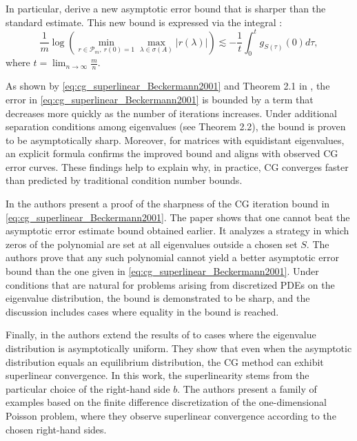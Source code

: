 In particular, \citeauthor{cg_superlinear_Beckermann2001} derive a new asymptotic error bound that is sharper than the standard estimate. This new bound is expressed via the integral \cite[Equation 1.8]{cg_superlinear_Beckermann2001}:
\begin{equation}
    \frac{1}{m} \log \left(\min_{r\in\mathcal{P}_m, \ r(0)=1}\max_{\lambda \in \sigma(A)}|r(\lambda)|\right) \lesssim-\frac{1}{t} \int_0^t g_{S(\tau)}(0) d \tau,
    \label{eq:cg_superlinear_Beckermann2001}
\end{equation}
where $t = \lim_{n\to\infty}\frac{m}{n}$.

As shown by \cref{eq:cg_superlinear_Beckermann2001} and Theorem 2.1 in \cite{cg_sharp_bound_Beckermann2001}, the error in \cref{eq:cg_superlinear_Beckermann2001} is bounded by a term that decreases more quickly as the number of iterations increases. Under additional separation conditions among eigenvalues (see Theorem 2.2), the bound is proven to be asymptotically sharp. Moreover, for matrices with equidistant eigenvalues, an explicit formula \cite[Corollary 3.2 and Equation 3.11]{cg_superlinear_Beckermann2001} confirms the improved bound and aligns with observed CG error curves. These findings help to explain why, in practice, CG converges faster than predicted by traditional condition number bounds.

In \cite{cg_sharp_bound_Beckermann2001} the authors present a proof of the sharpness of the CG iteration bound in \cref{eq:cg_superlinear_Beckermann2001}. The paper shows that one cannot beat the asymptotic error estimate bound obtained earlier. It analyzes a strategy in which zeros of the polynomial are set at all eigenvalues outside a chosen set $S$. The authors prove that any such polynomial cannot yield a better asymptotic error bound than the one given in \cref{eq:cg_superlinear_Beckermann2001}. Under conditions that are natural for problems arising from discretized PDEs on the eigenvalue distribution, the bound is demonstrated to be sharp, and the discussion includes cases where equality in the bound is reached.

Finally, in \cite{cg_superlinear_rhs_Beckermann2002} the authors extend the results of \cite{cg_superlinear_Beckermann2001} to cases where the eigenvalue distribution is asymptotically uniform. They show that even when the asymptotic distribution equals an equilibrium distribution, the CG method can exhibit superlinear convergence. In this work, the superlinearity stems from the particular choice of the right-hand side $b$. The authors present a family of examples based on the finite difference discretization of the one-dimensional Poisson problem, where they observe superlinear convergence according to the chosen right-hand sides.
